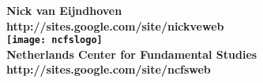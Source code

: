 \documentclass[a4paper,landscape,pdftex]{article}
\author{Nick van Eijndhoven}
\date{Copyright $\copyright$ NCFS, 2008}
\begin{document}
\begin{titlepage}
\begin{center}
\vspace*{-3.5cm}
{\LARGE \bf
 Nick van Eijndhoven\\[1mm]
 http://sites.google.com/site/nickveweb\\
 \texttt{[image: ncfslogo]}\\[-2mm]
 Netherlands Center for Fundamental Studies\\[2mm]
 http://sites.google.com/site/ncfsweb
}
\end{center}
\end{titlepage}









\end{document}
